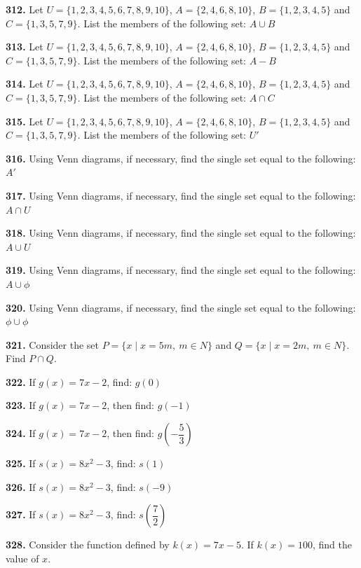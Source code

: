 \documentclass[11pt]{article}
\begin{document}
\bigskip
\noindent\textbf{312.} Let $U=\{1,2,3,4,5,6,7,8,9,10\}$, $A=\{2,4,6,8,10\}$, $B=\{1,2,3,4,5\}$ and $C=\{1,3,5,7,9\}$. List the members of the following set: $A\cup B$

\bigskip
\noindent\textbf{313.} Let $U=\{1,2,3,4,5,6,7,8,9,10\}$, $A=\{2,4,6,8,10\}$, $B=\{1,2,3,4,5\}$ and $C=\{1,3,5,7,9\}$. List the members of the following set: $A-B$

\bigskip
\noindent\textbf{314.} Let $U=\{1,2,3,4,5,6,7,8,9,10\}$, $A=\{2,4,6,8,10\}$, $B=\{1,2,3,4,5\}$ and $C=\{1,3,5,7,9\}$. List the members of the following set: $A\cap C$

\bigskip
\noindent\textbf{315.} Let $U=\{1,2,3,4,5,6,7,8,9,10\}$, $A=\{2,4,6,8,10\}$, $B=\{1,2,3,4,5\}$ and $C=\{1,3,5,7,9\}$. List the members of the following set: $U'$

\bigskip
\noindent\textbf{316.} Using Venn diagrams, if necessary, find the single set equal to the following: $A'$

\bigskip
\noindent\textbf{317.} Using Venn diagrams, if necessary, find the single set equal to the following: $A\cap U$

\bigskip
\noindent\textbf{318.} Using Venn diagrams, if necessary, find the single set equal to the following: $A\cup U$

\bigskip
\noindent\textbf{319.} Using Venn diagrams, if necessary, find the single set equal to the following: $A\cup \phi$

\bigskip
\noindent\textbf{320.} Using Venn diagrams, if necessary, find the single set equal to the following: $\phi\cup\phi$

\bigskip
\noindent\textbf{321.} Consider the set $P=\{x \mid x=5m,\ m\in N\}$ and $Q=\{x \mid x=2m,\ m\in N\}$. Find $P\cap Q$.

\bigskip
\noindent\textbf{322.} If $g(x)=7x-2$, find: $g(0)$

\bigskip
\noindent\textbf{323.} If $g(x)=7x-2$, then find: $g(-1)$

\bigskip
\noindent\textbf{324.} If $g(x)=7x-2$, then find: $g\!\left(-\dfrac{5}{3}\right)$

\bigskip
\noindent\textbf{325.} If $s(x)=8x^2-3$, find: $s(1)$

\bigskip
\noindent\textbf{326.} If $s(x)=8x^2-3$, find: $s(-9)$

\bigskip
\noindent\textbf{327.} If $s(x)=8x^2-3$, find: $s\!\left(\dfrac{7}{2}\right)$

\bigskip
\noindent\textbf{328.} Consider the function defined by $k(x)=7x-5$. If $k(x)=100$, find the value of $x$.
\end{document}
